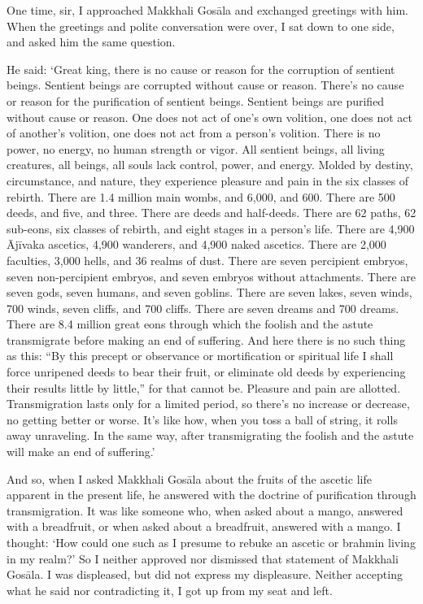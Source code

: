\documentclass[12pt,openany]{book}%
\begin{document}
One time, sir, I approached Makkhali \textsanskrit{Gosāla} and exchanged greetings with him. When the greetings and polite conversation were over, I sat down to one side, and asked him the same question. 

He said: ‘Great king, there is no cause or reason for the corruption of sentient beings. Sentient beings are corrupted without cause or reason. There’s no cause or reason for the purification of sentient beings. Sentient beings are purified without cause or reason. One does not act of one’s own volition, one does not act of another’s volition, one does not act from a person’s volition. There is no power, no energy, no human strength or vigor. All sentient beings, all living creatures, all beings, all souls lack control, power, and energy. Molded by destiny, circumstance, and nature, they experience pleasure and pain in the six classes of rebirth. There are 1.4 million main wombs, and 6,000, and 600. There are 500 deeds, and five, and three. There are deeds and half-deeds. There are 62 paths, 62 sub-eons, six classes of rebirth, and eight stages in a person’s life. There are 4,900 \textsanskrit{Ājīvaka} ascetics, 4,900 wanderers, and 4,900 naked ascetics. There are 2,000 faculties, 3,000 hells, and 36 realms of dust. There are seven percipient embryos, seven non-percipient embryos, and seven embryos without attachments. There are seven gods, seven humans, and seven goblins. There are seven lakes, seven winds, 700 winds, seven cliffs, and 700 cliffs. There are seven dreams and 700 dreams. There are 8.4 million great eons through which the foolish and the astute transmigrate before making an end of suffering. And here there is no such thing as this: “By this precept or observance or mortification or spiritual life I shall force unripened deeds to bear their fruit, or eliminate old deeds by experiencing their results little by little,” for that cannot be. Pleasure and pain are allotted. Transmigration lasts only for a limited period, so there’s no increase or decrease, no getting better or worse. It’s like how, when you toss a ball of string, it rolls away unraveling. In the same way, after transmigrating the foolish and the astute will make an end of suffering.’ 

And so, when I asked Makkhali \textsanskrit{Gosāla} about the fruits of the ascetic life apparent in the present life, he answered with the doctrine of purification through transmigration. It was like someone who, when asked about a mango, answered with a breadfruit, or when asked about a breadfruit, answered with a mango. I thought: ‘How could one such as I presume to rebuke an ascetic or brahmin living in my realm?’ So I neither approved nor dismissed that statement of Makkhali \textsanskrit{Gosāla}. I was displeased, but did not express my displeasure. Neither accepting what he said nor contradicting it, I got up from my seat and left. 
\end{document}
